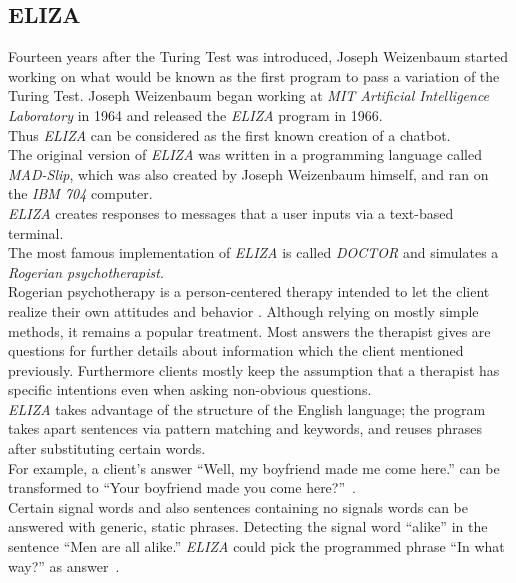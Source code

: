 \subsection{ELIZA}
\label{eliza}

Fourteen years after the Turing Test was introduced, Joseph Weizenbaum started working on what would be known as the first program to pass a variation of the Turing Test.
Joseph Weizenbaum began working at \emph{MIT Artificial Intelligence Laboratory} in 1964 and released the \emph{ELIZA} program in 1966.
\\
Thus \emph{ELIZA} can be considered as the first known creation of a chatbot.
\\

The original version of \emph{ELIZA} was written in a programming language called \emph{MAD-Slip},
which was also created by Joseph Weizenbaum himself, and ran on the \emph{IBM 704} computer.
\\
\emph{ELIZA} creates responses to messages that a user inputs via a text-based terminal.
\\

The most famous implementation of \emph{ELIZA} is called \emph{DOCTOR} and simulates a \emph{Rogerian psychotherapist}.
\\
Rogerian psychotherapy is a person-centered therapy intended to let the client realize their own attitudes and behavior \cite{rogerian}.
Although relying on mostly simple methods, it remains a popular treatment.
Most answers the therapist gives are questions for further details about information which the client mentioned previously.
Furthermore clients mostly keep the assumption that a therapist has specific intentions even when asking non-obvious questions.
\\

\emph{ELIZA} takes advantage of the structure of the English language;
the program takes apart sentences via pattern matching and keywords, and reuses phrases after substituting certain words.
\\
For example, a client's answer ``Well, my boyfriend made me come here.'' can be transformed to ``Your boyfriend made you come here?''~\cite{elizatest}.
\\
Certain signal words and also sentences containing no signals words can be answered with generic, static phrases.
Detecting the signal word ``alike'' in the sentence ``Men are all alike.'' \emph{ELIZA} could pick the programmed phrase ``In what way?'' as answer~\cite{elizatest}.
\\

